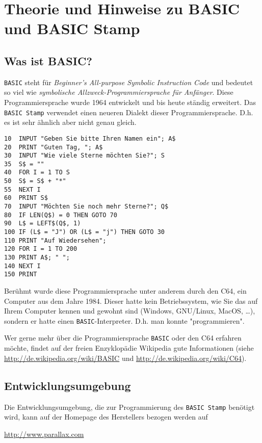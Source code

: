 \section{Theorie und Hinweise zu BASIC und BASIC Stamp}

\subsection{Was ist BASIC?}
\verb|BASIC| steht für 
\emph{Beginner's All-purpose Symbolic Instruction Code}
und bedeutet so viel wie
\emph{symbolische Allzweck-Programmiersprache für Anfänger}.
Diese Programmiersprache wurde 1964 entwickelt und bis heute 
ständig erweitert. Das \verb|BASIC Stamp| verwendet einen neueren
Dialekt dieser Programmiersprache. D.h. es ist sehr ähnlich aber 
nicht genau gleich.

\begin{lstlisting}[label=Pure BASIC Code, caption=Echter BASIC Code]
10  INPUT "Geben Sie bitte Ihren Namen ein"; A$
20  PRINT "Guten Tag, "; A$
30  INPUT "Wie viele Sterne möchten Sie?"; S
35  S$ = ""
40  FOR I = 1 TO S
50  S$ = S$ + "*"
55  NEXT I
60  PRINT S$
70  INPUT "Möchten Sie noch mehr Sterne?"; Q$
80  IF LEN(Q$) = 0 THEN GOTO 70
90  L$ = LEFT$(Q$, 1)
100 IF (L$ = "J") OR (L$ = "j") THEN GOTO 30
110 PRINT "Auf Wiedersehen";
120 FOR I = 1 TO 200
130 PRINT A$; " ";
140 NEXT I
150 PRINT
\end{lstlisting}

\noindent
Berühmt wurde diese Programmiersprache unter anderem durch den C64,
ein Computer aus dem Jahre 1984. Dieser hatte kein Betriebssystem,
wie Sie das auf Ihrem Computer kennen und gewohnt sind 
(Windows, GNU/Linux, MacOS, \dots), sondern er hatte einen 
\verb|BASIC|-Interpreter. D.h. man konnte "programmieren". 

Wer gerne mehr über die Programmiersprache \verb|BASIC| oder den C64
erfahren möchte,
findet auf der freien Enzyklopädie Wikipedia gute Informationen
(siehe \url{http://de.wikipedia.org/wiki/BASIC} und 
\url{http://de.wikipedia.org/wiki/C64}).

\subsection{Entwicklungsumgebung}
Die Entwicklungsumgebung, die zur Programmierung des \verb|BASIC Stamp|
benötigt wird, kann auf der Homepage des Herstellers bezogen werden auf
\begin{center}
\url{http://www.parallax.com}
\end{center}

